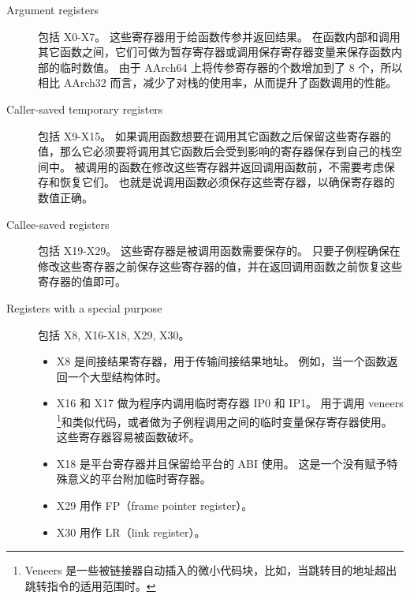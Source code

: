 \begin{description}
  \item[Argument registers] 包括 X0-X7。
    这些寄存器用于给函数传参并返回结果。
    在函数内部和调用其它函数之间，它们可做为暂存寄存器或调用保存寄存器变量来保存函数内部的临时数值。
    由于 AArch64 上将传参寄存器的个数增加到了 8 个，所以相比 AArch32 而言，减少了对栈的使用率，从而提升了函数调用的性能。
  \item[Caller-saved temporary registers] 包括 X9-X15。
    如果调用函数想要在调用其它函数之后保留这些寄存器的值，那么它必须要将调用其它函数后会受到影响的寄存器保存到自己的栈空间中。
    被调用的函数在修改这些寄存器并返回调用函数前，不需要考虑保存和恢复它们。
    也就是说调用函数必须保存这些寄存器，以确保寄存器的数值正确。
  \item[Callee-saved registers] 包括 X19-X29。
    这些寄存器是被调用函数需要保存的。
    只要子例程确保在修改这些寄存器之前保存这些寄存器的值，并在返回调用函数之前恢复这些寄存器的值即可。
  \item[Registers with a special purpose] 包括 X8, X16-X18, X29, X30。

    \begin{itemize}
      \item 
        X8 是间接结果寄存器，用于传输间接结果地址。
        例如，当一个函数返回一个大型结构体时。
      \item 
        X16 和 X17 做为程序内调用临时寄存器 IP0 和 IP1。
        用于调用 veneers \footnote{
          Veneers 是一些被链接器自动插入的微小代码块，比如，当跳转目的地址超出跳转指令的适用范围时。
        }和类似代码，或者做为子例程调用之间的临时变量保存寄存器使用。
        这些寄存器容易被函数破坏。
      \item 
        X18 是平台寄存器并且保留给平台的 ABI 使用。
        这是一个没有赋予特殊意义的平台附加临时寄存器。
      \item 
        X29 用作 FP（frame pointer register）。
      \item 
        X30 用作 LR（link register）。
    \end{itemize}

\end{description}

